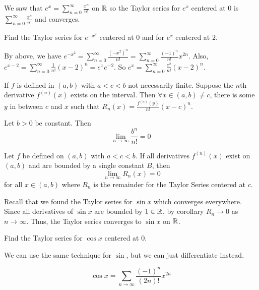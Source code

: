 \documentclass{article}
\begin{document}
        \begin{example}
          We saw that $e^x = \sum_{n=0}^\infty \frac{x^n}{n!}$ on $\mathbb{R}$ so the Taylor series for $e^x$ centered at $0$ is $\sum_{n=0}^\infty \frac{x^n}{n!}$ and converges.

          Find the Taylor series for $e^{-x^2}$ centered at $0$ and for $e^x$ centered at $2$.

          By above, we have $e^{-x^2} = \sum_{n=0}^\infty \frac{(-x^2)^n}{n!} = \sum_{n=0}^\infty \frac{(-1)^n}{n!}x^{2n}$. Also, $e^{x-2} = \sum_{n=0}^\infty \frac{1}{n!}(x-2)^n = e^xe^{-2}$. So $e^x = \sum_{n=0}^\infty \frac{e^2}{n!}(x-2)^n$.
        \end{example}
        \begin{cthm}
          If $f$ is defined in $(a, b)$ with $a < c < b$ not necessarily finite. Suppose the $n$th derivative $f^{(n)}(x)$ exists on the interval. Then $\forall x \in (a, b) \neq c$, there is some $y$ in between $c$ and $x$ such that $R_n(x) = \frac{f^{(n)}(y)}{n!} (x-c)^n$.
        \end{cthm}
        \begin{lemma}
          Let $b > 0$ be constant. Then \[
            \lim_{n\to\infty} \frac{b^n}{n!} = 0
          \]
        \end{lemma}
        \begin{corollary}
          Let $f$ be defined on $(a, b)$ with $a < c < b$. If all derivatives $f^{(n)}(x)$ exist on $(a, b)$ and are bounded by a single constant $B$, then \[
            \
            \lim_{n\to\infty} R_n(x) = 0
          \] for all $x \in (a, b)$ where $R_n$ is the remainder for the Taylor Series centered at $c$.
        \end{corollary}
        \begin{example}
          Recall that we found the Taylor series for $\sin x$ which converges everywhere. Since all derivatives of $\sin x$ are bounded by $1 \in \mathbb{R}$, by corollary $R_n \to 0$ as $n \to \infty$. Thus, the Taylor series converges to $\sin x$ on $\mathbb{R}$.
        \end{example}
        \begin{example}
          Find the Taylor series for $\cos x$ centered at $0$.

          We can use the same technique for $\sin$, but we can just differentiate instead.

          \[
            \cos x = \sum_{n\to\infty} \frac{(-1)^n}{(2n)!}x^{2n}
          \]
        \end{example}
\end{document}
